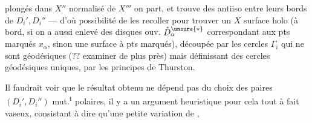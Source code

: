 plongés dans $X''$ normalisé de $X'''$  on
part, et  trouve des antiiso entre
leurs bords  de $D_i',D_i''$ ---
d'où possibilité de les recoller pour
trouver un $X$ surface holo (à bord,
si on a aussi enlevé des disques ouv.
$\mathring D_\alpha^{\unsure{*}}$ correspondant aux pts marqués $x_\alpha$,
sinon une surface à pts marqués),
découpée par les cercles $\Gamma_i$ qui ne
sont   géodésiques
($??$ 
examiner de plus près) mais définissant
des cercles géodésiques uniques,
par les principes de Thurston.

Il faudrait voir que le résultat
obtenu ne dépend pas du choix des
paires $(D_i',D_i'')$ mut.\textsuperscript{t} polaires, il y
a un argument heuristique pour
cela tout à fait vaseux, consistant
à dire qu'une petite variation de ,

